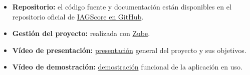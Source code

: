 \begin{itemize}
    \item \textbf{Repositorio:} el código fuente y documentación están disponibles en el repositorio oficial de \href{https://github.com/pac1006/IAGScore}{IAGScore en GitHub}.
    \item \textbf{Gestión del proyecto:} realizada con \href{https://zube.io/miorganizacion/iagscore/w/workspace-1/kanban}{Zube}.
    \item \textbf{Vídeo de presentación:} \href{https://universidaddeburgos-my.sharepoint.com/:v:/g/personal/pac1006_alu_ubu_es/EfB4_46cvc1Ltzs4VFGbCFkBWj3Dm_AiB9mt6hpTRJkKeQ?nav=eyJyZWZlcnJhbEluZm8iOnsicmVmZXJyYWxBcHAiOiJPbmVEcml2ZUZvckJ1c2luZXNzIiwicmVmZXJyYWxBcHBQbGF0Zm9ybSI6IldlYiIsInJlZmVycmFsTW9kZSI6InZpZXciLCJyZWZlcnJhbFZpZXciOiJNeUZpbGVzTGlua0NvcHkifX0&e=3IHW2I}{presentación} general del proyecto y sus objetivos.
    \item \textbf{Vídeo de demostración:} \href{https://universidaddeburgos-my.sharepoint.com/:v:/g/personal/pac1006_alu_ubu_es/ETGJTbAviu5NrIwAoXvITHYBXlwclYbDOcRTdR0pd7QDdw?nav=eyJyZWZlcnJhbEluZm8iOnsicmVmZXJyYWxBcHAiOiJPbmVEcml2ZUZvckJ1c2luZXNzIiwicmVmZXJyYWxBcHBQbGF0Zm9ybSI6IldlYiIsInJlZmVycmFsTW9kZSI6InZpZXciLCJyZWZlcnJhbFZpZXciOiJNeUZpbGVzTGlua0NvcHkifX0&e=vbhU2M}{demostración} funcional de la aplicación en uso.
\end{itemize}
